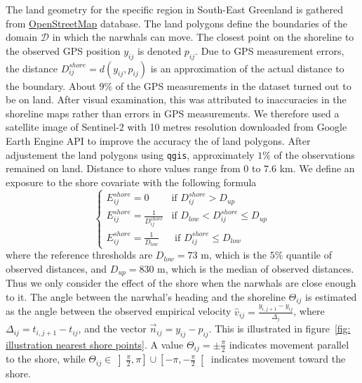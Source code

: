 \documentclass[11pt]{article}
\newcommand {\1}{\mathbb{1}}
\theoremstyle{definition}
\theoremstyle{remark}
\theoremstyle{remark}
\begin{document}
The land geometry for the specific region in South-East Greenland is gathered from \href{https://www.openstreetmap.org/#map=11/70.4029/-27.2928}{OpenStreetMap} database. The land polygons define the boundaries of the domain $\mathcal{D}$ in which the narwhals can move. The closest point on the shoreline to the observed GPS position $y_{ij}$  is denoted $p_{ij}$. Due to GPS measurement errors, the distance $D^{shore}_{ij}=d(y_{ij},p_{ij})$ is an approximation of the actual distance to the boundary. About $9\%$ of the GPS measurements in the dataset turned out to be on land. After visual examination, this was attributed to inaccuracies in the shoreline maps rather than errors in GPS measurements. We therefore used a satellite image of Sentinel-2 with 10 metres resolution downloaded from Google Earth Engine API to improve the accuracy the of land polygons. After adjustement the land polygons using \texttt{qgis},  approximately $1 \%$ of the observations remained on land. Distance to shore values range from $0$ to $7.6$ km. We define an exposure to the shore covariate with the following formula
\begin{equation}
	\left\{
	\begin{array}{ll}
		E^{shore}_{ij}=0 & \mbox{if } D^{shore}_{ij}>D_{up} \\
		E^{shore}_{ij}=\frac{1}{D^{shore}_{ij}} & \mbox{if } D_{low}<D^{shore}_{ij} \leq D_{up} \\
		E^{shore}_{ij}=\frac{1}{D_{low}} & \mbox{ if } D^{shore}_{ij} \leq D_{low}
	\end{array}
	\right.
	\label{eq: exp shore definition}
\end{equation}
where the reference thresholds are $D_{low}=73$ m, which is the $5\%$ quantile of observed distances, and $D_{up}=830$ m, which is the median of observed distances. Thus we only consider the effect of the shore when the narwhals are close enough to it. 
The angle between the narwhal's heading and the shoreline $\Theta_{ij}$ is estimated as the angle between the observed empirical velocity $\hat{v}_{ij}=\frac{y_{i,j+1}-y_{ij}}{\Delta_j}$, where $\Delta_{ij}=t_{i,j+1}-t_{ij}$, and the vector $\vec{n}_{ij}=y_{ij}-p_{ij}$. This is illustrated in figure~\ref{fig: illustration nearest shore points}. A value $\Theta_{ij}=\pm \frac{\pi}{2}$ indicates movement parallel to the shore, while $\Theta_{ij} \in \left]\frac{\pi}{2},\pi\right] \cup \left[-\pi,-\frac{\pi}{2}\right[$ indicates movement toward the shore. 
\end{document}
